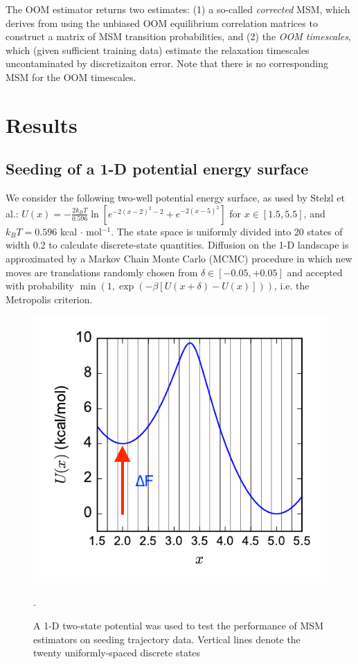 \documentclass[%
 aip,
rsi,%
 amsmath,amssymb,
 reprint,%
]{revtex4-1}
\begin{document}
The OOM estimator returns two estimates: (1) a so-called \textit{corrected} MSM, which derives from using the unbiased OOM equilibrium correlation matrices to construct a matrix of MSM transition probabilities, and (2) the \textit{OOM timescales}, which (given sufficient training data) estimate the relaxation timescales uncontaminated by discretizaiton error.  Note that there is no corresponding MSM for the OOM timescales. 





\section*{Results}

\subsection*{Seeding of a 1-D potential energy surface}

We consider the following two-well potential energy surface, as used by Stelzl et al.\cite{Stelzl:2017gra}:  $U(x) = -\frac{2k_BT}{0.596} \ln [ e^{-2(x-2)^2-2} + e^{-2(x-5)^2} ] $
for $x \in [1.5,5.5]$, and $k_BT = 0.596$ kcal $\cdot$ mol$^{-1}$.  The state space is uniformly divided into 20 states of width 0.2 to calculate discrete-state quantities. Diffusion on the 1-D landscape is approximated by a Markov Chain Monte Carlo (MCMC) procedure in which new moves are translations randomly chosen from $\delta \in [-0.05, +0.05]$ and accepted with probability $\min(1, \exp( -\beta [U(x+\delta)-U(x)]))$, i.e. the Metropolis criterion.

\begin{figure}[ht!]
    \includegraphics[width=0.9\columnwidth]{figures/1D-potential-v2.pdf}
    \caption{A 1-D two-state potential was used to test the performance of MSM estimators on seeding trajectory data.  Vertical lines denote the twenty uniformly-spaced discrete states}.
    \label{fig:1D-potential-v2}
\end{figure}
\end{document}
